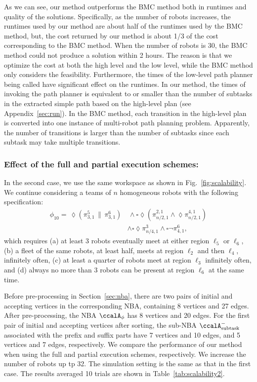 \documentclass[Afour,sageh,times]{sagej}
\newcommand{\auto}[1]{\ccalA_{\textup{#1}}}
\newcommand{\autop}{\ccalA_{\phi}}
\renewcommand{\ap}[3]{\mathcal{\pi}_{{#1},{#2}}^{#3}}
\begin{document}
{{As we can see, our method outperforms the BMC method both in runtimes and quality of the solutions. Specifically, as the number of robots increases, the runtimes used by our method are about half of the runtimes used by the BMC method, but, the cost returned by our method is about 1/3 of the cost corresponding to the BMC method. When the number of robots is 30, the BMC method could not produce a solution within 2 hours. The reason is that we optimize the cost at both the high level and the low level, while the BMC method only considers the feasibility. Furthermore, the times of the low-level path planner being called have significant effect on the runtimes. In our method, the times of invoking the path planner is equivalent to or smaller than the number of subtasks in the extracted simple path based on the high-level plan (see Appendix~\ref{sec:run}). In the BMC method, each transition in the high-level plan is converted into one instance of multi-robot path planning problem. Apparently, the number of transitions is larger than the number of subtasks since each subtask may take multiple transitions.



\subsubsection{Effect of the full and partial execution schemes:} In the second case, we use the same workspace as shown in Fig.~\ref{fig:scalability}. We continue considering a teams of $n$ homogeneous robots with the following specification:
\begin{align*}
  \phi_{10} = \, \lozenge (\ap{3}{1}{5} \,\| \, \ap{3}{1}{6}) &\,\wedge   \square \lozenge (\ap{n/2}{1}{2,1} \wedge \lozenge \ap{n/2}{1}{4,1}) \\
  & \wedge  \square \lozenge \ap{n/4}{1}{3} \wedge \square \neg \ap{4}{1}{6},
\end{align*}
which requires (a) at least 3 robots eventually meet at either region $\ell_5$ or $\ell_6$, (b) a fleet of the same robots, at least half,  meets at region $\ell_2$ and then $\ell_4$, infinitely often, (c) at least a quarter of robots meet at region $\ell_3$ infinitely often, and (d) always no more than 3 robots can be present at region $\ell_6$ at the same time.



Before pre-processing in Section~\ref{sec:nba}, there are two pairs of initial and accepting vertices in the corresponding NBA, containing 8 vertices and 27 edges. After pre-processing,  the NBA $\autop$  has 8 vertices and 20 edges. For the first pair of initial and accepting vertices after sorting, the sub-NBA $\auto{subtask}^-$ associated with  the prefix and suffix parts have 7 vertices and 10 edges, and 5 vertices and 7 edges, respectively. We compare the performance of our method when using the full and partial execution schemes, respectively. We increase the number of robots up tp 32. The simulation setting is the same as that in the first case. The results averaged 10 trials are shown in Table~\ref{tab:scalability2}.

}}
\end{document}
